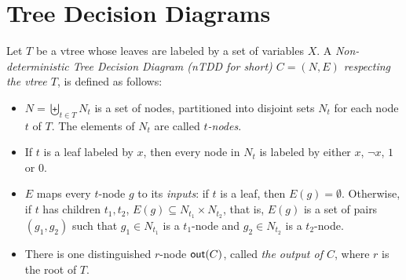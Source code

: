 \documentclass[a4paper,UKenglish,cleveref, autoref, thm-restate]{lipics-v2021}
\begin{document}
\section{Tree Decision Diagrams}
\label{sec:prop:dd}

Let $T$ be a vtree whose leaves are labeled by a set of variables $X$. A \emph{Non-deterministic Tree Decision Diagram (nTDD for short) $C=(N,E)$ respecting the vtree $T$}, is defined as follows: 
\begin{itemize}
\item $N = \biguplus_{t \in T} N_t$ is a set of nodes, partitioned into disjoint sets $N_t$ for each node $t$ of $T$. The elements of $N_t$ are called \emph{$t$-nodes}.
\item If $t$ is a leaf labeled by $x$, then every node in $N_t$ is labeled by either $x$, $\neg x$, $1$ or $0$.
\item $E$ maps every $t$-node $g$ to its \emph{inputs}: if $t$ is a leaf, then $E(g) = \emptyset$. Otherwise, if $t$ has children $t_1,t_2$, $E(g) \subseteq N_{t_1} \times N_{t_2}$, that is, $E(g)$ is a set of pairs $(g_1,g_2)$ such that $g_1 \in N_{t_1}$ is a $t_1$-node and $g_2 \in N_{t_2}$ is a $t_2$-node.
\item There is one distinguished $r$-node $\out$, called \emph{the output of $C$}, where $r$ is the root of $T$.
\end{itemize}
\end{document}
